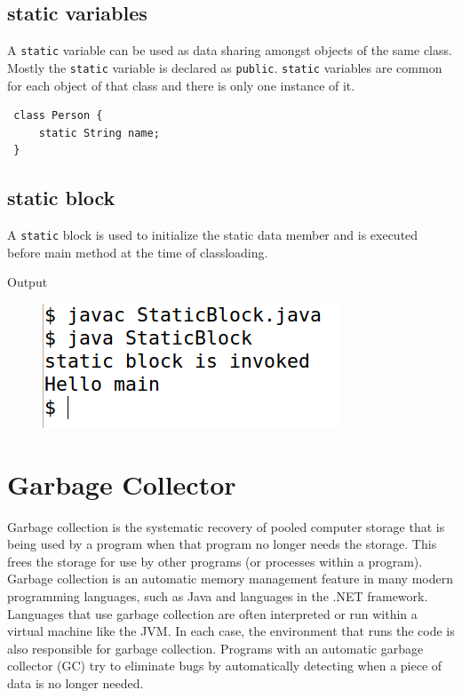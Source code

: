 \documentclass[11pt,a4paper]{article}
\begin{document}
 \subsection*{static variables}
 A \lstinline!static! variable can be used as data sharing amongst objects of the same class. Mostly the \lstinline!static! variable is declared as \lstinline!public!. \lstinline!static! variables are common for each object of that class and there is only one instance of it. 
 \begin{lstlisting}
 class Person {
     static String name;
 }
 \end{lstlisting} 

 \subsection*{static block} 
 A \lstinline!static! block is used to initialize the static data member and is executed before main method at the time of classloading.

 Output
 \begin{figure}[H] 
 \begin{center}
  \includegraphics[scale=.5]{StaticBlock.png}
   
 \end{center}
 \end{figure}

\section*{Garbage Collector}
Garbage collection is the systematic recovery of pooled computer storage that is being used by a program when that program no longer needs the storage. This frees the storage for use by other programs (or processes within a program).
Garbage collection is an automatic memory management feature in many modern programming languages, such as Java and languages in the .NET framework. Languages that use garbage collection are often interpreted or run within a virtual machine like the JVM. In each case, the environment that runs the code is also responsible for garbage collection.
Programs with an automatic garbage collector (GC) try to eliminate bugs by automatically detecting when a piece of data is no longer needed.
\end{document}
